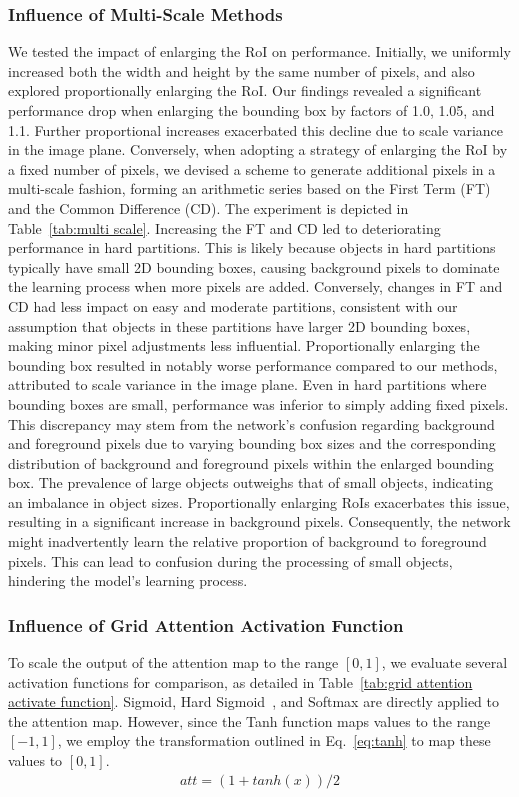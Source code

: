 \documentclass[journal]{IEEEtran}
\begin{document}
	\subsubsection{Influence of Multi-Scale Methods}
	We tested the impact of enlarging the RoI on performance. Initially, we uniformly increased both the width and height by the same number of pixels, and also explored proportionally enlarging the RoI. Our findings revealed a significant performance drop when enlarging the bounding box by factors of 1.0, 1.05, and 1.1. Further proportional increases exacerbated this decline due to scale variance in the image plane. Conversely, when adopting a strategy of enlarging the RoI by a fixed number of pixels, we devised a scheme to generate additional pixels in a multi-scale fashion, forming an arithmetic series based on the First Term (FT) and the Common Difference (CD). The experiment is depicted in Table~\ref{tab:multi scale}. Increasing the FT and CD led to deteriorating performance in hard partitions. This is likely because objects in hard partitions typically have small 2D bounding boxes, causing background pixels to dominate the learning process when more pixels are added. Conversely, changes in FT and CD had less impact on easy and moderate partitions, consistent with our assumption that objects in these partitions have larger 2D bounding boxes, making minor pixel adjustments less influential. Proportionally enlarging the bounding box resulted in notably worse performance compared to our methods, attributed to scale variance in the image plane. Even in hard partitions where bounding boxes are small, performance was inferior to simply adding fixed pixels. This discrepancy may stem from the network's confusion regarding background and foreground pixels due to varying bounding box sizes and the corresponding distribution of background and foreground pixels within the enlarged bounding box. The prevalence of large objects outweighs that of small objects, indicating an imbalance in object sizes. Proportionally enlarging RoIs exacerbates this issue, resulting in a significant increase in background pixels. Consequently, the network might inadvertently learn the relative proportion of background to foreground pixels. This can lead to confusion during the processing of small objects, hindering the model's learning process.
	
	\subsubsection{Influence of Grid Attention Activation Function}
	To scale the output of the attention map to the range $[0, 1]$, we evaluate several activation functions for comparison, as detailed in Table~\ref{tab:grid attention activate function}. Sigmoid, Hard Sigmoid~\cite{hard-sigmoid}, and Softmax are directly applied to the attention map. However, since the Tanh function maps values to the range $[-1, 1]$, we employ the transformation outlined in Eq.~\ref{eq:tanh} to map these values to $[0, 1]$.
		\begin{equation}
		\begin{aligned}
			att = (1+tanh(x))/2
			\label{eq:tanh}
		\end{aligned}
	\end{equation}
	
\end{document}
